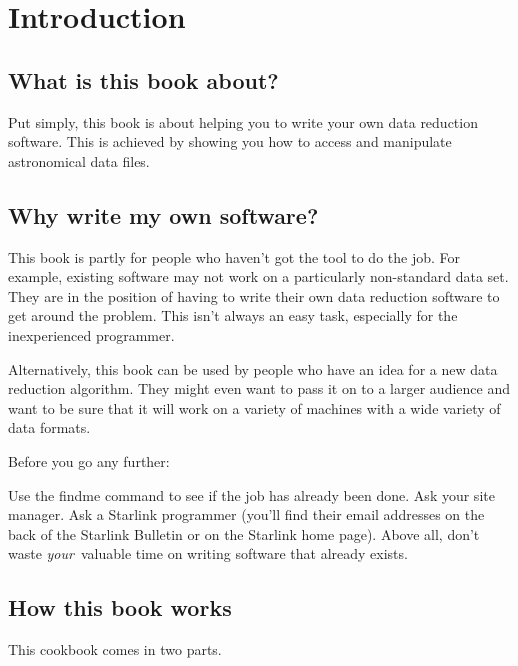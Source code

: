 \documentclass[11pt,nolof]{starlink}
\begin{document}
\scfrontmatter

\section{Introduction}

\subsection{What is this book about?}

Put simply, this book is about helping you to write
your own data reduction software. This is achieved
by showing you how to access and manipulate astronomical
data files.

\subsection{Why write my own software?}

This book is partly for people who haven't got the tool to do the job. For
example, existing software may not work on a particularly non-standard
data set.  They are in the position of having to write their own data
reduction software to get around the problem. This isn't always an easy
task, especially for the inexperienced programmer.

Alternatively, this book can be used by people who have an idea for a new
data reduction algorithm.  They might even want to pass it on to a larger
audience and want to be sure that it will work on a variety of machines
with a wide variety of data formats.

Before you go any further:

\begin{quote}
\end{quote}

Use the \textsf{findme} command  to see if the job
has already been done.
Ask your site manager. Ask a Starlink programmer (you'll find their email
addresses on the back of the Starlink Bulletin or on the Starlink home
page). Above all, don't waste \emph{your}\, valuable time on writing software
that already exists.

\subsection{How this book works}

This cookbook comes in two parts.
\end{document}
